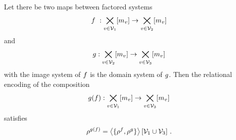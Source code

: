 \begin{theorem}\label{the:compositionByContraction}
	Let there be two maps between factored systems 
		\[ \exfunction : \bigtimes_{\node\in\nodes_1} [\catdimof{\node}] \rightarrow \bigtimes_{\node\in\nodes_2} [\catdimof{\node}] \]
	and 
		\[ g : \bigtimes_{v\in\mathcal{V}_2} [m_{v}] \rightarrow \bigtimes_{v\in\mathcal{V}_3} [m_{v}] \]
	with the image system of $f$ is the domain system of $g$.
	Then the relational encoding of the composition 
		\[ g(f) :  \bigtimes_{v\in\mathcal{V}_1} [m_{v}] \rightarrow \bigtimes_{v\in\mathcal{V}_3} [m_{v}] \]
	satisfies
		\[ \rho^{g(f)} = \left\langle \{\rho^{f},\rho^{g}\}\right\rangle \left[ \mathcal{V}_1\cup\mathcal{V}_3 \right] \, .  \]
\end{theorem}
